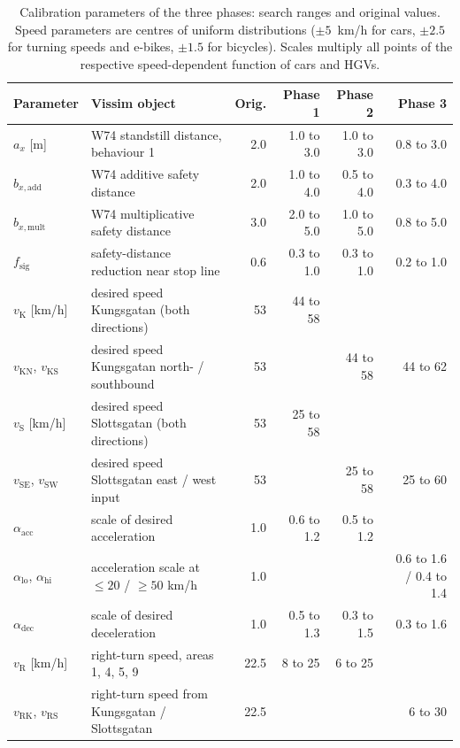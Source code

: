 \documentclass[11pt,a4paper]{article}
\newcommand{\kmh}{~km/h}
\begin{document}
\begin{table}[!htb]
\centering
\caption[Calibration parameters and search ranges]{Calibration parameters of the three phases:
search ranges and original values. Speed parameters are centres of uniform distributions
($\pm 5$\kmh{} for cars, $\pm 2.5$ for turning speeds and e-bikes, $\pm 1.5$ for bicycles). Scales
multiply all points of the respective speed-dependent function of cars and HGVs.}
\label{tab:params}
\footnotesize
\setlength{\tabcolsep}{4pt}
\begin{tabularx}{\textwidth}{lXrrrr}
\toprule
\textbf{Parameter} & \textbf{Vissim object} & \textbf{Orig.} & \textbf{Phase 1} & \textbf{Phase 2} & \textbf{Phase 3}\\
\midrule
$a_x$ [m] & W74 standstill distance, behaviour 1 & 2.0 & 1.0 to 3.0 & 1.0 to 3.0 & 0.8 to 3.0\\
$b_{x,\mathrm{add}}$ & W74 additive safety distance & 2.0 & 1.0 to 4.0 & 0.5 to 4.0 & 0.3 to 4.0\\
$b_{x,\mathrm{mult}}$ & W74 multiplicative safety distance & 3.0 & 2.0 to 5.0 & 1.0 to 5.0 & 0.8 to 5.0\\
$f_{\mathrm{sig}}$ & safety-distance reduction near stop line & 0.6 & 0.3 to 1.0 & 0.3 to 1.0 & 0.2 to 1.0\\
$v_{\mathrm{K}}$ [km/h] & desired speed Kungsgatan (both directions) & 53 & 44 to 58 & & \\
$v_{\mathrm{KN}}$, $v_{\mathrm{KS}}$ & desired speed Kungsgatan north- / southbound & 53 & & 44 to 58 & 44 to 62\\
$v_{\mathrm{S}}$ [km/h] & desired speed Slottsgatan (both directions) & 53 & 25 to 58 & & \\
$v_{\mathrm{SE}}$, $v_{\mathrm{SW}}$ & desired speed Slottsgatan east / west input & 53 & & 25 to 58 & 25 to 60\\
$\alpha_{\mathrm{acc}}$ & scale of desired acceleration & 1.0 & 0.6 to 1.2 & 0.5 to 1.2 & \\
$\alpha_{\mathrm{lo}}$, $\alpha_{\mathrm{hi}}$ & acceleration scale at $\le 20$ / $\ge 50$ km/h & 1.0 & & & 0.6 to 1.6 / 0.4 to 1.4\\
$\alpha_{\mathrm{dec}}$ & scale of desired deceleration & 1.0 & 0.5 to 1.3 & 0.3 to 1.5 & 0.3 to 1.6\\
$v_{\mathrm{R}}$ [km/h] & right-turn speed, areas 1, 4, 5, 9 & 22.5 & 8 to 25 & 6 to 25 & \\
$v_{\mathrm{RK}}$, $v_{\mathrm{RS}}$ & right-turn speed from Kungsgatan / Slottsgatan & 22.5 & & & 6 to 30\\

\end{tabularx}
\end{table}
\end{document}
